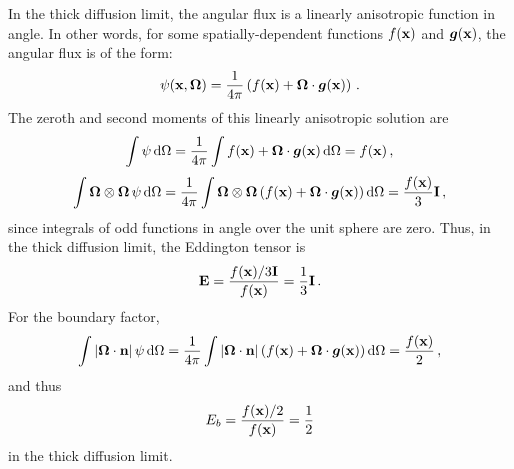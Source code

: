 \documentclass[../doc.tex]{subfiles}
\begin{document}
In the thick diffusion limit, the angular flux is a linearly anisotropic function in angle. In other words, for some spatially-dependent functions $f(\x)$ and $\vec{g}(\x)$, the angular flux is of the form: 
	\begin{equation}
		\psi(\x,\Omegahat) = \frac{1}{4\pi}\paren{f(\x) + \Omegahat\cdot\vec{g}(\x)} \,. 
	\end{equation}
The zeroth and second moments of this linearly anisotropic solution are 
	\begin{equation}
		\int \psi \ud \Omega = \frac{1}{4\pi} \int f(\x) + \Omegahat\cdot\vec{g}(\x) \ud \Omega = f(\x) \,, 
	\end{equation}
	\begin{equation}
		\int \Omegahat\otimes\Omegahat\,\psi \ud \Omega = \frac{1}{4\pi}\int \Omegahat\otimes\Omegahat\paren{f(\x) + \Omegahat\cdot\vec{g}(\x)} \ud \Omega = \frac{f(\x)}{3}\I \,, 
	\end{equation}
since integrals of odd functions in angle over the unit sphere are zero. Thus, in the thick diffusion limit, the Eddington tensor is 
	\begin{equation}
		\E = \frac{f(\x)/3\I}{f(\x)} = \frac{1}{3}\I \,. 
	\end{equation}
For the boundary factor, 
	\begin{equation}
		\int |\Omegahat\cdot\n|\,\psi \ud \Omega = \frac{1}{4\pi}\int |\Omegahat\cdot\n|\paren{f(\x) + \Omegahat\cdot\vec{g}(\x)} \ud \Omega = \frac{f(\x)}{2} \,, 
	\end{equation}
and thus 
	\begin{equation}
		E_b = \frac{f(\x)/2}{f(\x)} = \frac{1}{2} 
	\end{equation}
in the thick diffusion limit. 
\end{document}
